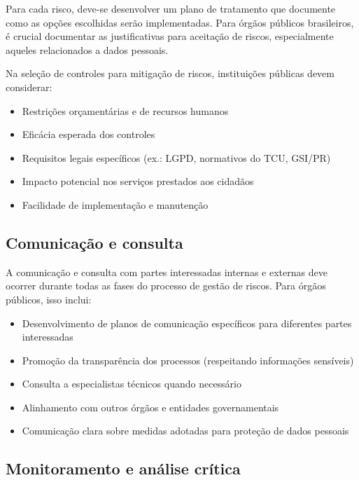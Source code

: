 \documentclass[12pt,a4paper]{report}
\begin{document}
Para cada risco, deve-se desenvolver um plano de tratamento que documente como as opções escolhidas serão implementadas. Para órgãos públicos brasileiros, é crucial documentar as justificativas para aceitação de riscos, especialmente aqueles relacionados a dados pessoais.

\begin{infobox}
Na seleção de controles para mitigação de riscos, instituições públicas devem considerar:

\begin{itemize}
  \item Restrições orçamentárias e de recursos humanos
  \item Eficácia esperada dos controles
  \item Requisitos legais específicos (ex.: LGPD, normativos do TCU, GSI/PR)
  \item Impacto potencial nos serviços prestados aos cidadãos
  \item Facilidade de implementação e manutenção
\end{itemize}
\end{infobox}

\subsection{Comunicação e consulta}

A comunicação e consulta com partes interessadas internas e externas deve ocorrer durante todas as fases do processo de gestão de riscos. Para órgãos públicos, isso inclui:

\begin{itemize}
  \item Desenvolvimento de planos de comunicação específicos para diferentes partes interessadas
  \item Promoção da transparência dos processos (respeitando informações sensíveis)
  \item Consulta a especialistas técnicos quando necessário
  \item Alinhamento com outros órgãos e entidades governamentais
  \item Comunicação clara sobre medidas adotadas para proteção de dados pessoais
\end{itemize}

\subsection{Monitoramento e análise crítica}
\end{document}

